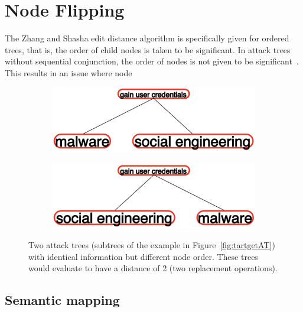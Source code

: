 \section{Node Flipping}

The Zhang and Shasha edit distance algorithm is specifically given for ordered trees, that is, the order of child nodes is taken to be significant. In attack trees without sequential conjunction, the order of nodes is not given to be significant~\cite{mauw_foundations_2006,jhawar_attack_2015}. This results in an issue where node


\begin{figure}
    \begin{subfigure}{.45\linewidth}
        \includegraphics[width=\linewidth]{img/NodeFlip1.png}
    \end{subfigure}
    \begin{subfigure}{.45\linewidth}
        \includegraphics[width=\linewidth]{img/NodeFlip2.png}
    \end{subfigure}
    \caption{Two attack trees (subtrees of the example in Figure~\ref{fig:tartgetAT}) with identical information but different node order. These trees would evaluate to have a distance of 2 (two replacement operations).}
    \label{fig:nodeflipping}
\end{figure}




\subsection{Semantic mapping}


